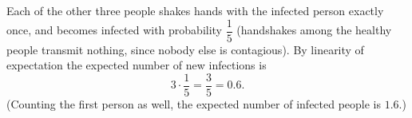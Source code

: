 Each of the other three people shakes hands with the infected person exactly once, and becomes infected with probability $\dfrac15$ (handshakes among the healthy people transmit nothing, since nobody else is contagious). By linearity of expectation the expected number of new infections is
\[3\cdot\dfrac15=\boxed{\dfrac35=0.6}.\]
(Counting the first person as well, the expected number of infected people is $1.6$.)
